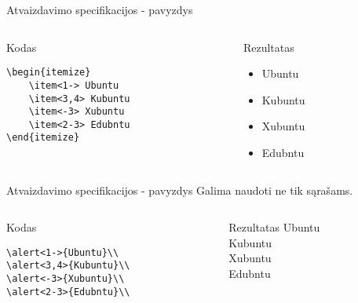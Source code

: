 \documentclass[11pt,a4paper]{beamer}
\begin{document}
\begin{frame}[fragile]{Atvaizdavimo specifikacijos - pavyzdys}
    \begin{columns}[t]
        \begin{column}{5cm}
            \begin{block}{Kodas}
\begin{verbatim}
\begin{itemize}
    \item<1-> Ubuntu
    \item<3,4> Kubuntu
    \item<-3> Xubuntu 
    \item<2-3> Edubntu
\end{itemize}
\end{verbatim}
            \end{block}
        \end{column}
        \begin{column}{5cm}
            \begin{block}{Rezultatas}
                \begin{itemize}
                    \item<1-> Ubuntu
                    \item<3,4> Kubuntu
                    \item<-3> Xubuntu 
                    \item<2-3> Edubntu
                \end{itemize}
            \end{block}
        \end{column}
    \end{columns}
\end{frame}
\begin{frame}[fragile]{Atvaizdavimo specifikacijos - pavyzdys}
    Galima naudoti ne tik sąrašams.
    \begin{columns}[t]
        \begin{column}{5cm}
            \begin{block}{Kodas}
\begin{verbatim}
\alert<1->{Ubuntu}\\
\alert<3,4>{Kubuntu}\\
\alert<-3>{Xubuntu}\\
\alert<2-3>{Edubntu}\\
\end{verbatim}
            \end{block}
        \end{column}
        \begin{column}{5cm}
            \begin{block}{Rezultatas}
                \alert<1->{Ubuntu}\\
                \alert<3,4>{Kubuntu}\\
                \alert<-3>{Xubuntu}\\
                \alert<2-3>{Edubntu}\\
            \end{block}
        \end{column}
    \end{columns}
\end{frame}
\end{document}
